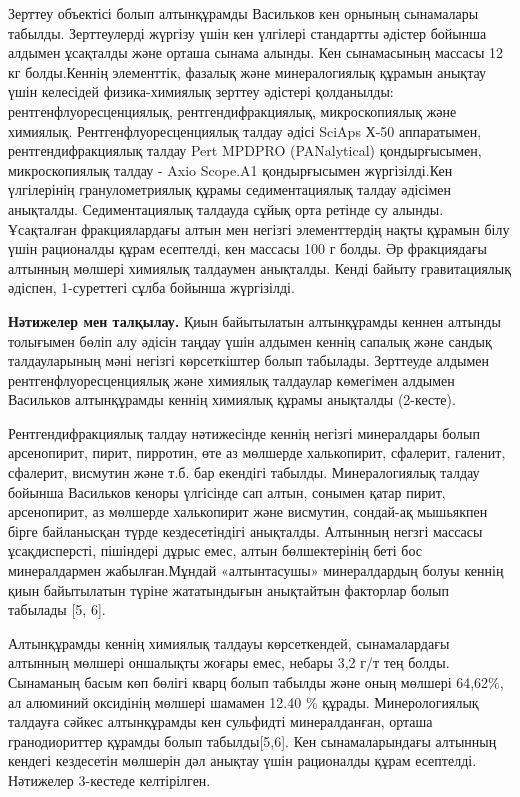 \begin{multicols}{2}

Зерттеу объектісі болып алтынқұрамды Васильков кен орнының сынамалары
табылды. Зерттеулерді жүргізу үшін кен үлгілері стандартты әдістер
бойынша алдымен ұсақталды және орташа сынама алынды. Кен сынамасының
массасы 12 кг болды.Кеннің элементтік, фазалық және минералогиялық
құрамын анықтау үшін келесідей физика-химиялық зерттеу әдістері
қолданылды: рентгенфлуоресценциялық, рентгендифракциялық, микроскопиялық
және химиялық. Рентгенфлуоресценциялық талдау әдісі SciAps Х-50
аппаратымен, рентгендифракциялық талдау Pert MPDPRO (PANalytical)
қондырғысымен, микроскопиялық талдау - Axio Scope.A1 қондырғысымен
жүргізілді.Кен үлгілерінің гранулометриялық құрамы седиментациялық
талдау әдісімен анықталды. Седиментациялық талдауда сұйық орта ретінде
су алынды. Ұсақталған фракциялардағы алтын мен негізгі элементтердің
нақты құрамын білу үшін рационалды құрам есептелді, кен массасы 100 г
болды. Әр фракциядағы алтынның мөлшері химиялық талдаумен анықталды.
Кенді байыту гравитациялық әдіспен, 1-суреттегі сұлба бойынша
жүргізілді.

{\bfseries Нәтижелер мен талқылау.} Қиын байытылатын алтынқұрамды кеннен алтынды толығымен бөліп алу әдісін
таңдау үшін алдымен кеннің сапалық және сандық талдауларының мәні
негізгі көрсеткіштер болып табылады. Зерттеуде алдымен
рентгенфлуоресценциялық және химиялық талдаулар көмегімен алдымен
Васильков алтынқұрамды кеннің химиялық құрамы анықталды (2-кесте).

Рентгендифракциялық талдау нәтижесінде кеннің негізгі минералдары болып
арсенопирит, пирит, пирротин, өте аз мөлшерде халькопирит, сфалерит,
галенит, сфалерит, висмутин және т.б. бар екендігі табылды.
Минералогиялық талдау бойынша Васильков кеноры үлгісінде сап алтын,
сонымен қатар пирит, арсенопирит, аз мөлшерде халькопирит және висмутин,
сондай-ақ мышьякпен бірге байланысқан түрде кездесетіндігі анықталды.
Алтынның негзгі массасы ұсақдисперсті, пішіндері дұрыс емес, алтын
бөлшектерінің беті бос минералдармен жабылған.Мұндай «алтынтасушы»
минералдардың болуы кеннің қиын байытылатын түріне жататындығын
анықтайтын факторлар болып табылады {[}5, 6{]}.

Алтынқұрамды кеннің химиялық талдауы көрсеткендей, сынамалардағы
алтынның мөлшері оншалықты жоғары емес, небары 3,2 г/т тең болды.
Сынаманың басым көп бөлігі кварц болып табылды және оның мөлшері
64,62\%, ал алюминий оксидінің мөлшері шамамен 12.40 \% құрады.
Минерологиялық талдауға сәйкес алтынқұрамды кен сульфидті минералданған,
орташа гранодиориттер құрамды болып табылды{[}5,6{]}. Кен
сынамаларындағы алтынның кендегі кездесетін мөлшерін дәл анықтау үшін
рационалды құрам есептелді. Нәтижелер 3-кестеде келтірілген.
\end{multicols}

